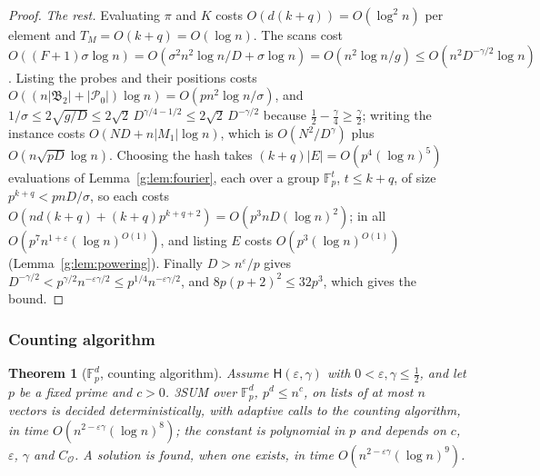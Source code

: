 \documentclass[11pt]{article}
\newtheorem{theorem}{Theorem}[section]
\theoremstyle{definition}
\theoremstyle{remark}
\newcommand{\Fp}{\mathbb{F}_p}
\newcommand{\eps}{\varepsilon}
\newcommand{\Pq}{\mathcal{P}}
\newcommand{\Hyp}{\mathsf{H}}
\begin{document}
\begin{proof}
\emph{The rest.} Evaluating $\pi$ and $K$ costs $O(d(k+q))=O(\log^2n)$ per element and $T_M=O(k+q)=O(\log n)$. The scans cost $O((F+1)\sigma\log n)=O(\sigma^2n^2\log n/D+\sigma\log n)=O(n^2\log n/g)\le O(n^2D^{-\gamma/2}\log n)$. Listing the probes and their positions costs $O((n|\mathfrak B_2|+|\Pq_0|)\log n)=O(pn^2\log n/\sigma)$, and $1/\sigma\le2\sqrt{g/D}\le2\sqrt2\,D^{\gamma/4-1/2}\le2\sqrt2\,D^{-\gamma/2}$ because $\frac12-\frac\gamma4\ge\frac\gamma2$; writing the instance costs $O(ND+n|M_1|\log n)$, which is $O(N^2/D^\gamma)$ plus $O(n\sqrt{pD}\log n)$. Choosing the hash takes $(k+q)|E|=O(p^4(\log n)^5)$ evaluations of Lemma~\ref{g:lem:fourier}, each over a group $\Fp^t$, $t\le k+q$, of size $p^{k+q}<pnD/\sigma$, so each costs $O(nd(k+q)+(k+q)p^{k+q+2})=O(p^3nD(\log n)^2)$; in all $O(p^7n^{1+\eps}(\log n)^{O(1)})$, and listing $E$ costs $O(p^3(\log n)^{O(1)})$ (Lemma~\ref{g:lem:powering}). Finally $D>n^\eps/p$ gives $D^{-\gamma/2}<p^{\gamma/2}n^{-\eps\gamma/2}\le p^{1/4}n^{-\eps\gamma/2}$, and $8p(p+2)^2\le32p^3$, which gives the bound.
\end{proof}

\subsubsection{Counting algorithm}

\begin{theorem}[$\Fp^d$, counting algorithm]\label{g:thm:B}
Assume $\Hyp(\eps,\gamma)$ with $0<\eps,\gamma\le\frac12$, and let $p$ be a fixed prime and $c>0$. 3SUM over $\Fp^d$, $p^d\le n^c$, on lists of at most $n$ vectors is decided deterministically, with adaptive calls to the counting algorithm, in time $O(n^{2-\eps\gamma}(\log n)^8)$; the constant is polynomial in $p$ and depends on $c$, $\eps$, $\gamma$ and $C_{\mathcal O}$. A solution is found, when one exists, in time $O(n^{2-\eps\gamma}(\log n)^9)$.
\end{theorem}
\end{document}
